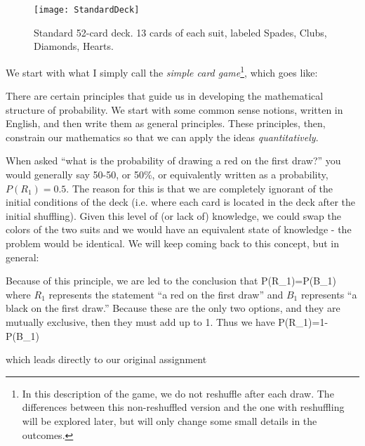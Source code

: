 \begin{figure}
\texttt{[image: StandardDeck]}
\caption{Standard 52-card deck.  13 cards of each suit, labeled Spades, Clubs, Diamonds, Hearts.}\label{fig:std_cards}
\end{figure}

We start with what I simply call the {\em simple card game}\footnote{In this description of the game, we do not reshuffle after each draw.  The differences between this non-reshuffled version and the one with reshuffling will be explored later, but will only change some small details in the outcomes.}, which goes like:
\beq
{}
\label{eq:simplecardgame}
\eeq

There are certain principles that guide us in developing the mathematical structure of probability.  We start with some common sense notions, written in English, and then write them as general principles.  These principles, then, constrain our mathematics so that we can apply the ideas {\em quantitatively}.

When asked ``what is the probability of drawing a red on the first draw?'' you would generally say 50-50, or 50\%, or equivalently written as a probability, $P(R_{1})=0.5$. The reason for this is that we are completely ignorant of the initial conditions of the deck (i.e. where each card is located in the deck after the initial shuffling).  Given this level of (or lack of) knowledge, we could swap the colors of the two suits and we would have an equivalent state of knowledge - the problem would be identical.  We will keep coming back to this concept, but in general:

Because of this principle, we are led to the conclusion that
\beqn
P(R_{1})=P(B_{1})
\eeqn
where $R_{1}$ represents the statement ``a red on the first draw'' and $B_{1}$ represents ``a black on the first draw.''  Because these are the only two options, and they are mutually exclusive, then they must add up to 1.  Thus we have
\beqn
P(R_{1})=1-P(B_{1})
\eeqn

which leads directly to our original assignment

